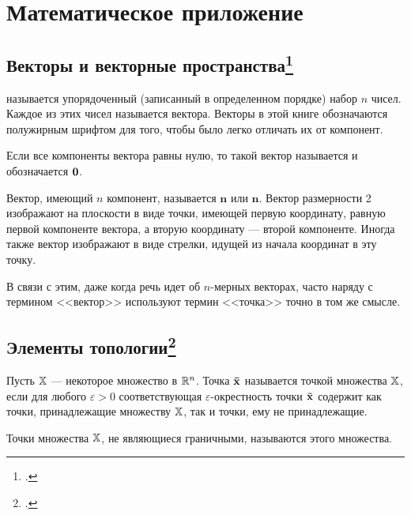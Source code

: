 \chapter{Математическое приложение}

\section{Векторы и векторные
пространства\protect\footnote{\cite{Braverman:1976}.}}\label{app:vectors}

 называется упорядоченный (записанный в
определенном порядке) набор $n$ чисел. Каждое из этих чисел
называется  вектора. Векторы в этой книге
обозначаются полужирным шрифтом для того, чтобы было легко отличать
их от компонент.


Если все компоненты вектора равны нулю, то такой вектор называется
 и обозначается $\mathbf{0}$.



Вектор, имеющий $n$ компонент, называется $\mathbf{n}$ или  $\mathbf{n}$. Вектор
размерности 2 изображают на плоскости в виде точки, имеющей первую
координату, равную первой компоненте вектора, а вторую координату
--- второй компоненте. Иногда также вектор изображают в виде
стрелки, идущей из начала координат в эту точку.

В связи с этим, даже когда речь идет об $n$-мерных векторах, часто
наряду с термином <<вектор>> используют термин <<точка>> точно в том
же смысле.


\section{Элементы топологии\protect\footnote{\cite{Takayama:1985}.}}\label{app:topology}


Пусть $\mathbb{X}$ --- некоторое множество в $\mathbb{R}^n$. Точка $\mathbf{\bar x}$
называется  точкой множества $\mathbb{X}$, если для любого
$\varepsilon > 0$ соответствующая
$\varepsilon$\nobreakdash-\hspace{0pt}окрестность точки $\mathbf{\bar
x}$ содержит как точки, принадлежащие множеству $\mathbb{X}$, так и
точки, ему не принадлежащие.

Точки множества $\mathbb{X}$, не являющиеся граничными, называются
 этого множества.

